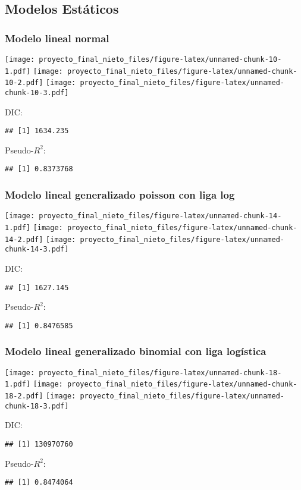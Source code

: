 \documentclass[]{article}
\begin{document}
\subsection{Modelos Estáticos}\label{modelos-estaticos}

\subsubsection{Modelo lineal normal}\label{modelo-lineal-normal}

\texttt{[image: proyecto\_final\_nieto\_files/figure-latex/unnamed-chunk-10-1.pdf]}
\texttt{[image: proyecto\_final\_nieto\_files/figure-latex/unnamed-chunk-10-2.pdf]}
\texttt{[image: proyecto\_final\_nieto\_files/figure-latex/unnamed-chunk-10-3.pdf]}

DIC:

\begin{verbatim}
## [1] 1634.235
\end{verbatim}

Pseudo-\(R^2\):

\begin{verbatim}
## [1] 0.8373768
\end{verbatim}

\subsubsection{Modelo lineal generalizado poisson con liga
log}\label{modelo-lineal-generalizado-poisson-con-liga-log}

\texttt{[image: proyecto\_final\_nieto\_files/figure-latex/unnamed-chunk-14-1.pdf]}
\texttt{[image: proyecto\_final\_nieto\_files/figure-latex/unnamed-chunk-14-2.pdf]}
\texttt{[image: proyecto\_final\_nieto\_files/figure-latex/unnamed-chunk-14-3.pdf]}

DIC:

\begin{verbatim}
## [1] 1627.145
\end{verbatim}

Pseudo-\(R^2\):

\begin{verbatim}
## [1] 0.8476585
\end{verbatim}

\subsubsection{Modelo lineal generalizado binomial con liga
logística}\label{modelo-lineal-generalizado-binomial-con-liga-logistica}

\texttt{[image: proyecto\_final\_nieto\_files/figure-latex/unnamed-chunk-18-1.pdf]}
\texttt{[image: proyecto\_final\_nieto\_files/figure-latex/unnamed-chunk-18-2.pdf]}
\texttt{[image: proyecto\_final\_nieto\_files/figure-latex/unnamed-chunk-18-3.pdf]}

DIC:

\begin{verbatim}
## [1] 130970760
\end{verbatim}

Pseudo-\(R^2\):

\begin{verbatim}
## [1] 0.8474064
\end{verbatim}
\end{document}
